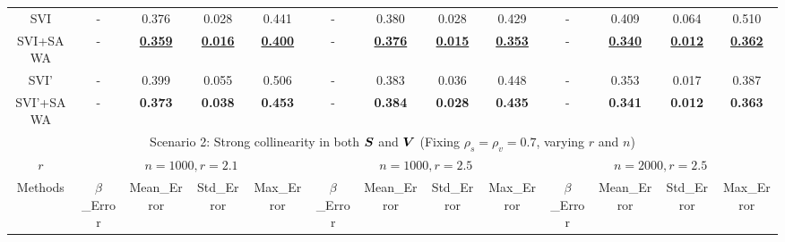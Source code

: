 \begin{table*}[!ht]
{\begin{tabular}{@{}ccccccccccccc@{}}
\multicolumn{1}{c|}{SVI}       & -                    & 0.376                & 0.028                & \multicolumn{1}{c|}{0.441}                & -                    & 0.380                & 0.028                & \multicolumn{1}{c|}{0.429}                & -                    & 0.409                & 0.064                & 0.510                \\
\multicolumn{1}{c|}{SVI+SAWA}  & -                    & {\ul \textbf{0.359}} & {\ul \textbf{0.016}} & \multicolumn{1}{c|}{{\ul \textbf{0.400}}} & -                    & {\ul \textbf{0.376}} & {\ul \textbf{0.015}} & \multicolumn{1}{c|}{{\ul \textbf{0.353}}} & -                    & {\ul \textbf{0.340}} & {\ul \textbf{0.012}} & {\ul \textbf{0.362}} \\ \midrule
\multicolumn{1}{c|}{SVI'}      & -                    & 0.399                & 0.055                & \multicolumn{1}{c|}{0.506}                & -                    & 0.383                & 0.036                & \multicolumn{1}{c|}{0.448}                & -                    & 0.353                & 0.017                & 0.387                \\
\multicolumn{1}{c|}{SVI'+SAWA} & -                    & \textbf{0.373}       & \textbf{0.038}       & \multicolumn{1}{c|}{\textbf{0.453}}       & -                    & \textbf{0.384}       & \textbf{0.028}       & \multicolumn{1}{c|}{\textbf{0.435}}       & -                    & \textbf{0.341}       & \textbf{0.012}       & \textbf{0.363}       \\ \midrule
\multicolumn{13}{c}{Scenario 2: Strong collinearity in both $\boldsymbol{S}$ and $\boldsymbol{V}$ (Fixing $\rho_s=\rho_v=0.7$, varying $r$ and $n$)}                                                                                                                                                                                                                                                     \\ \midrule
\multicolumn{1}{c|}{$r$}       & \multicolumn{4}{c|}{$n=1000, r=2.1$}                                                                           & \multicolumn{4}{c|}{$n=1000, r=2.5$}                                                                           & \multicolumn{4}{c}{$n=2000, r=2.5$}                                                       \\ \midrule
\multicolumn{1}{c|}{Methods}   & $\beta$\_Error       & Mean\_Error          & Std\_Error           & \multicolumn{1}{c|}{Max\_Error}           & $\beta$\_Error       & Mean\_Error          & Std\_Error           & \multicolumn{1}{c|}{Max\_Error}           & $\beta$\_Error       & Mean\_Error          & Std\_Error           & Max\_Error           \\ \midrule

\end{tabular}}
\end{table*}
